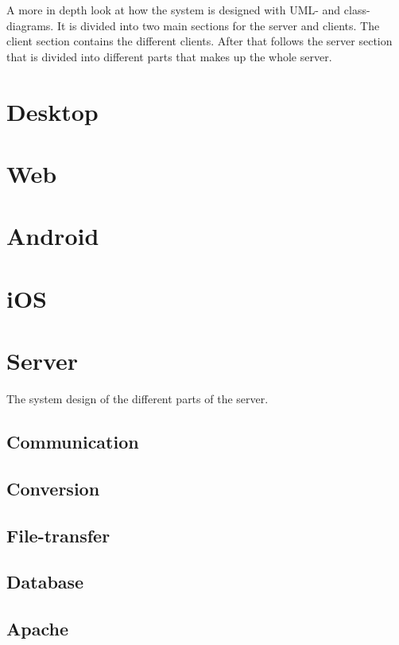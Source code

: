 
A more in depth look at how the system is designed with UML- and class-diagrams. It is divided into two main sections for the server and clients. The client section contains the different clients. After that follows the server section that is divided into different parts that makes up the whole server. 

\section{Desktop}

\FloatBarrier

\section{Web}


\FloatBarrier

\section{Android}

\FloatBarrier

\section{iOS}

\FloatBarrier

\section{Server}
The system design of the different parts of the server.
\subsection{Communication}

\FloatBarrier
\subsection{Conversion}

\FloatBarrier
\subsection{File-transfer}

\FloatBarrier
\subsection{Database}

\FloatBarrier
\subsection{Apache}

\FloatBarrier
